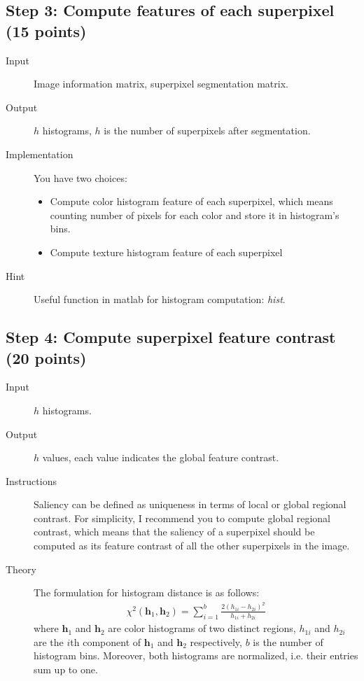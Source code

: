 \documentclass[12pt]{article}
\begin{document}
\subsection{Step 3: Compute features of each superpixel (15 points)}

\begin{description}
\item[Input] Image information matrix, superpixel segmentation matrix. 
\item[Output] $h$ histograms, $h$ is the number of superpixels after segmentation.
\item[Implementation] You have two choices:
\begin{itemize}
\item Compute color histogram feature of each superpixel, which means counting number of pixels for each color and store it in histogram's bins.
\item Compute texture histogram feature of each superpixel
\end{itemize}
\item[Hint] Useful function in matlab for histogram computation: \emph{hist}.
\end{description}

\subsection{Step 4: Compute superpixel feature contrast (20 points)}

\begin{description}
\item[Input] $h$ histograms.
\item[Output] $h$ values, each value indicates the global feature contrast.
\item[Instructions] Saliency can be defined as uniqueness in terms of local or global regional contrast. For simplicity, I recommend you to compute global regional contrast, which means that the saliency of a superpixel should be computed as its feature contrast of all the other superpixels in the image. 
\item[Theory] The formulation for histogram distance is as follows:
\begin{align}
\chi^2(\textbf{h}_1, \textbf{h}_2) = \sum_{i=1}^{b}\frac{2(h_{1i}-h_{2i})^2}{h_{1i}+h_{2i}}
\end{align}
where $\textbf{h}_1$ and $\textbf{h}_2$ are color histograms of two distinct regions,  $h_{1i}$ and $h_{2i}$ are the $i$th component of $\textbf{h}_1$ and $\textbf{h}_2$ respectively, $b$ is the number of histogram bins. Moreover, both histograms are normalized, i.e. their entries sum up to one.
\end{description}
\end{document}

